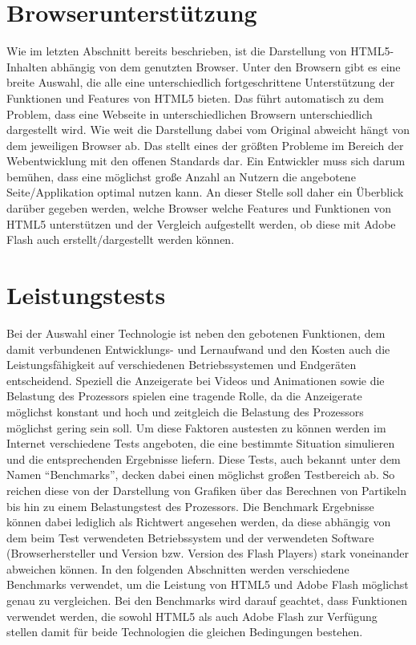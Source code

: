 \section{Browserunterstützung}
Wie im letzten Abschnitt bereits beschrieben, ist die Darstellung von
HTML5-Inhalten abhängig von dem genutzten Browser. Unter den Browsern
gibt es eine breite Auswahl, die alle eine unterschiedlich fortgeschrittene
Unterstützung der Funktionen und Features von HTML5 bieten. Das führt
automatisch zu dem Problem, dass eine Webseite in unterschiedlichen
Browsern unterschiedlich dargestellt wird. Wie weit die Darstellung
dabei vom Original abweicht hängt von dem jeweiligen Browser ab.
Das stellt eines der größten Probleme im Bereich der Webentwicklung
mit den offenen Standards dar. Ein Entwickler muss sich darum bemühen,
dass eine möglichst große Anzahl an Nutzern die angebotene Seite/Applikation
optimal nutzen kann.
\newline\newline
An dieser Stelle soll daher ein Überblick darüber gegeben werden, welche
Browser welche Features und Funktionen von HTML5 unterstützen und der
Vergleich aufgestellt werden, ob diese mit Adobe Flash auch
erstellt/dargestellt werden können.

\section{Leistungstests}
Bei der Auswahl einer Technologie ist neben den gebotenen Funktionen, dem damit
verbundenen Entwicklungs- und Lernaufwand und den Kosten auch die
Leistungsfähigkeit auf verschiedenen Betriebssystemen und Endgeräten
entscheidend. Speziell die Anzeigerate bei Videos und Animationen sowie die
Belastung des Prozessors spielen eine tragende Rolle, da die Anzeigerate
möglichst konstant und hoch und zeitgleich die Belastung des Prozessors
möglichst gering sein soll.
\newline\newline
Um diese Faktoren austesten zu können werden im Internet verschiedene
Tests angeboten, die eine bestimmte Situation simulieren und die
entsprechenden Ergebnisse liefern. Diese Tests, auch bekannt unter dem Namen
``Benchmarks'', decken dabei einen möglichst großen Testbereich ab. So reichen
diese von der Darstellung von Grafiken über das Berechnen von Partikeln
bis hin zu einem Belastungstest des Prozessors.
\newline\newline
Die Benchmark Ergebnisse können dabei lediglich als Richtwert angesehen
werden, da diese abhängig von dem beim Test verwendeten Betriebssystem und der
verwendeten Software (Browserhersteller und Version bzw. Version des Flash
Players) stark voneinander abweichen können.
\newline\newline
In den folgenden Abschnitten werden verschiedene Benchmarks verwendet, um
die Leistung von HTML5 und Adobe Flash möglichst genau zu vergleichen.
Bei den Benchmarks wird darauf geachtet, dass Funktionen verwendet werden,
die sowohl HTML5 als auch Adobe Flash zur Verfügung stellen damit für beide
Technologien die gleichen Bedingungen bestehen.

